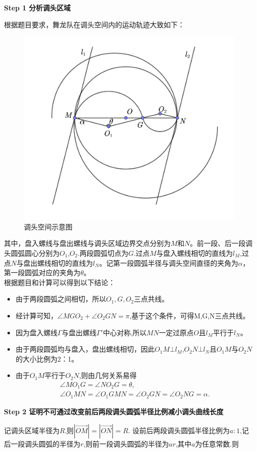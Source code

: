 \documentclass[../main.tex]{subfiles}
\begin{document}
\noindent\textbf{Step 1 分析调头区域}
\par 根据题目要求，舞龙队在调头空间内的运动轨迹大致如下：
\begin{figure}[H]
\centering
\includegraphics[width=.6\textwidth]{4}
\caption{调头空间示意图}
\label{2.2.2.2.2.2} 
\end{figure}
\par 其中，盘入螺线与盘出螺线与调头区域边界交点分别为$M$和$N$。前一段、后一段调头圆弧圆心分别为$O_1$,$O_2$.两段圆弧切点为$G$.过点$M$与盘入螺线相切的直线为$l_M$,过点$N$与盘出螺线相切的直线为$l_N$。记第一段圆弧半径与调头空间直径的夹角为$\alpha $，第一段圆弧对应的夹角为$\theta $。
\\ 根据题目和计算可以得到以下结论：
\begin{itemize}
\item  由于两段圆弧之间相切，所以$O_1,G,O_2$三点共线。
\item  经计算可知，$\angle MGO_2+\angle O_2GN=\pi $,基于这个条件，可得M,G,N三点共线。
\item  因为盘入螺线$\varGamma$与盘出螺线$\varGamma'$中心对称,所以$MN$一定过原点$O$且$l_M$平行于$ l_N$。
\item  由于两段圆弧均与盘入，盘出螺线相切，因此$O_1M\bot l_M${,}$O_2N\bot l_N$且$O_1M$与$O_2N$的大小比例为2：1。
\item  由于$O_1M $平行于$ O_2N$,则由几何关系易得
\begin{gather}
\angle MO_1G=\angle NO_2G=\theta,\label{1.........33}
\\
\angle O_1MN=\angle O_1GMN=\angle O_2GN=\angle O_2NG=\alpha .\label{1.........34}
\end{gather}
\end{itemize} 
\noindent\textbf{Step 2 证明不可通过改变前后两段调头圆弧半径比例减小调头曲线长度} 
\par 记调头区域半径为$R$,则$\left| \overrightarrow{OM} \right|=\left| \overrightarrow{ON} \right|=R$. 设前后两段调头圆弧半径比例为$a:1$,记后一段调头圆弧的半径为$r$,则前一段调头圆弧的半径为$ar$,其中$a$为任意常数.则
\end{document}
